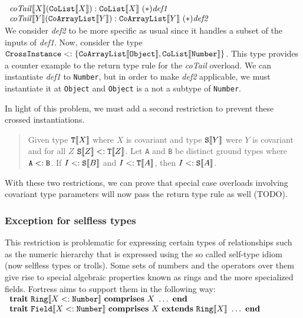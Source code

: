 \documentclass[preprint]{sigplanconf}
\newcommand{\ob}[1]{\ensuremath{\llbracket {#1} \rrbracket}}
\begin{document}
$\begin{array}{l}
{\it coTail}\ob{X}({\tt CoList}\ob{X}) :{\tt CoList}\ob{X}~(*){\it def1}\\
{\it coTail}\ob{Y}({\tt CoArrayList}\ob{Y}) : {\tt CoArrayList}\ob{Y}~(*){\it def2}\\
\end{array}$\\

We consider {\it def2} to be more specific as usual since it handles a subset of the inputs of {\it def1}.
Now, consider the type ${\tt CrossInstance} <: \{ {\tt CoArrayList}\ob{{\tt Object}}, {\tt CoList}\ob{{\tt Number}} \}$.
This type provides a counter example to the return type rule for the {\it coTail} overload.  We can instantiate
{\it def1} to {\tt Number}, but in order to make {\it def2} applicable, we must instantiate it at {\tt Object} and
{\tt Object} is a not a subtype of {\tt Number}.

In light of this problem, we must add a second restriction to prevent these crossed instantiations.  

\begin{quote}
Given type ${\tt T}\ob{X}$ where $X$ is covariant and type ${\tt S}\ob{Y}$ were $Y$ is covariant and for all $Z$
${\tt S}\ob{Z} <: {\tt T}\ob{Z}$. Let {\tt A} and {\tt B} be distinct ground types where ${\tt A} <: {\tt B}$.  If
$I <: {\tt S}\ob{B}$ and $I <: {\tt T}\ob{A}$, then $I <: {\tt S}\ob{A}$.
\end{quote}

With these two restrictions, we can prove that special case overloads involving covariant type parameters 
will now pass the return type rule as well (TODO).

\subsubsection{Exception for selfless types}

This restriction is problematic for expressing certain types of relationships such as the numeric hierarchy
that is expressed using the so called self-type idiom (now selfless types or trolls). Some sets of numbers
and the operators over them give rise to special algebraic properties known as rings and the more specialized fields.  Fortress
aims to support them in the following way:\\

$\begin{array}{l}
{\bf trait}~{\tt Ring}\ob{X <: {\tt Number}}~{\bf comprises}~X~\dots~{\bf end}\\
{\bf trait}~{\tt Field}\ob{X <: {\tt Number}}~{\bf comprises}~X~{\bf extends}~{\tt Ring}\ob{X}~\dots~{\bf end}
\end{array}$\\
\end{document}
